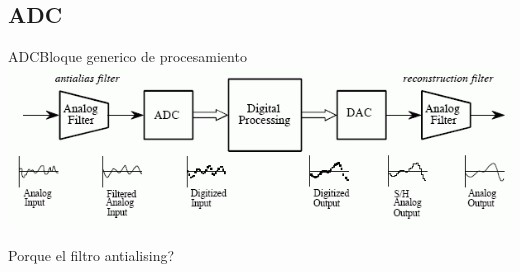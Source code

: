 \begin{darkframes}
       \section{ADC}
      \begin{frame}{ADC}{Bloque generico de procesamiento}
         \center\includegraphics[width=1\textwidth]{1_clase/adc_dac}
         \begin{alertblock} {Porque el filtro antialising?}
         \end{alertblock}
         \vfill
      \end{frame}


\end{darkframes}
